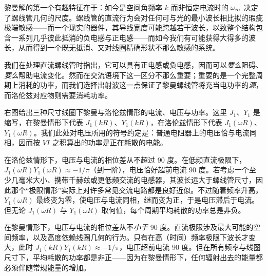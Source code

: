 黎曼解的第一个有趣特征在于：如今是空间角频率 $k$ 而非恒定电流时的 $\omega_m$ 决定了螺线管几何的尺度。螺线管的直流行为会对任何可与光的最小波长相比拟的瑕疵极端敏感——而一个现实的器件，其导线宽度可能跨越若干波长，以致整个结构包含一系列几乎彼此抵消的负电感与正电感——而如今我们有可能获得大得多的波长，从而得到一个既无抵消、又对线圈精确形状不那么敏感的系统。


我们在处理直流螺线管时指出，它可以具有正电感或负电感，因而可以\emph{要么}阻碍、\emph{要么}帮助电流变化。然而在交流语境下这一区分不那么重要；重要的是一个完整周期上消耗的功率，而我们选择出射波这一点保证了黎曼螺线管将充当电功率的\emph{源}，而洛伦兹对应物则需要消耗功率。

右图给出三种尺寸线圈下黎曼与洛伦兹情形的电流、电压与功率。这里 $J_1$、$Y_1$ 是缩写，在黎曼情形下代表 $J_1(kR)$、$Y_1(kR)$，在洛伦兹情形下代表 $J_1(\omega R)$、$Y_1(\omega R)$。我们此处对电压所用的符号约定是：普通电阻器上的电压恰与电流同相，因而按 $VI$ 之积算出的功率是正在耗散的电能。

在洛伦兹情形下，电压与电流的相位差从不超过 90 度。在低频直流极限下，$J_1(\omega R) Y_1(\omega R) \approx -1/\pi$（到一阶），电压恰好超前电流 90 度。若考虑一个至少几毫米大小、携带千赫兹或更低频交流的电感器，其波长远大于螺线管尺寸，因此那个“极限情形”实际上对许多常见交流电路都是良好近似。不过随着频率升高，$Y_1(\omega R)$ 最终变为零，使电压与电流同相，继而变为正，于是电压滞后于电流。但无论 $J_1(\omega R)$ 与 $Y_1(\omega R)$ 取何值，每个周期平均耗散的功率总是非负。

在黎曼情形下，电压与电流的相位差从不\emph{小于} 90 度。直流极限涉及最大可能的空间频率，以及高度依赖线圈几何的行为。只有在高（时间）频率极限下波长才变大，此时 $J_1(kR) Y_1(kR) \approx -1/\pi$，电压超前电流 90 度。但在所有频率与线圈尺寸下，平均耗散的功率都是非正——因为在黎曼情形下，任何辐射出去的能量都必须伴随常规能量的增加。

